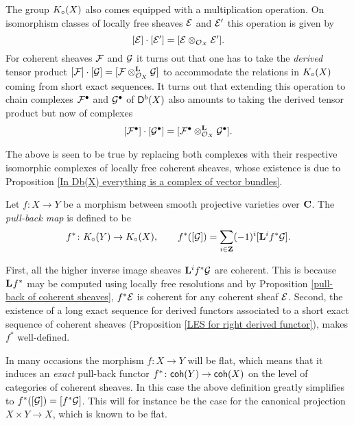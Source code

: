 The group $K_{\circ}(X)$ also comes equipped with a multiplication operation. On isomorphism classes of locally free sheaves $\mathcal E$ and $\mathcal E'$ this operation is given by
\[
    [\mathcal E]\cdot[\mathcal E'] = [\mathcal E \otimes_{{\mathcal{O}_{X}}} \mathcal E'].
\]
For coherent sheaves $\mathcal F$ and $\mathcal G$ it turns out that one has to take the \emph{derived} tensor product $[\mathcal F]\cdot[\mathcal G] = [\mathcal F \otimes_{{\mathcal{O}_{X}}}^{\mathbf{L}} \mathcal G]$ to accommodate the relations in $K_{\circ}(X)$ coming from short exact sequences. It turns out that extending this operation to chain complexes $\mathcal F^\bullet$ and $\mathcal G^\bullet$ of $\mathsf{D}^b(X)$ also amounts to taking the derived tensor product but now of complexes
\begin{equation}
    \label{eq: K-theory product compatibility}
    [\F^\bullet]\cdot [\G^\bullet] = [\derivedtensor{\F^\bullet}{\G^\bullet}{\struct{X}}].
\end{equation}

\begin{remark}
    The above is seen to be true by replacing both complexes with their respective isomorphic complexes of locally free coherent sheaves, whose existence is due to Proposition \ref{In Db(X) everything is a complex of vector bundles}.
\end{remark}

\begin{definition}
    Let $f \colon X \to Y$ be a morphism between smooth projective varieties over $\mathbf C$. The \emph{pull-back map} is defined to be
    \[
        f^* \colon K_{\circ}(Y) \to K_{\circ}(X), \qquad f^*([\mathcal G]) = \sum_{i \in \mathbf Z}(-1)^i[\mathbf{L}^{i}f^*\mathcal G].
    \]
\end{definition}

\begin{remark}
    First, all the higher inverse image sheaves $\mathbf{L}^{i}f^*\mathcal G$ are coherent. This is because $\mathbf{L}^{}f^*$ may be computed using locally free resolutions and by Proposition \ref{pull-back of coherent sheaves}, $f^*\mathcal E$ is coherent for any coherent sheaf $\mathcal E$. Second, the existence of a long exact sequence for derived functors associated to a short exact sequence of coherent sheaves (Proposition \ref{LES for right derived functor}), makes $f^*$ well-defined.    
    
    In many occasions the morphism $f \colon X \to Y$ will be flat, which means that it induces an \emph{exact} pull-back functor $f^* \colon \mathsf{coh}(Y) \to \mathsf{coh}(X)$ on the level of categories of coherent sheaves. In this case the above definition greatly simplifies to $f^*([\mathcal G]) = [f^*\mathcal G]$. This will for instance be the case for the canonical projection $X \times Y \to X$, which is known to be flat.  
\end{remark}

